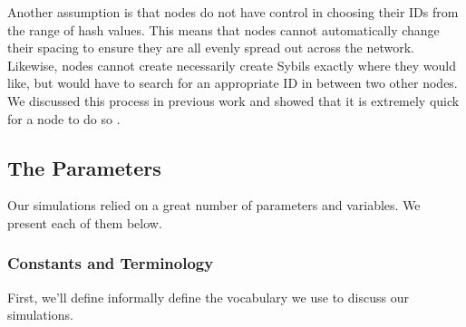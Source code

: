 \documentclass[11pt,letterpaper]{article}
\begin{document}
Another assumption is that nodes do not have control in choosing their IDs from the range of hash values.
This means that nodes cannot automatically change their spacing to ensure they are all evenly spread out across the network.
Likewise, nodes cannot create necessarily create Sybils exactly where they would like, but would have to search for an appropriate ID in between two other nodes.
We discussed this process in previous work and showed that it is extremely quick for a node to do so \cite{sybil-analysis}.





%
%
%


\subsection{The Parameters}

Our simulations relied on a great number of parameters and variables.
We present each of them below.

\subsubsection{Constants and Terminology}

First, we'll define informally define the vocabulary we use to discuss our simulations.
\end{document}

